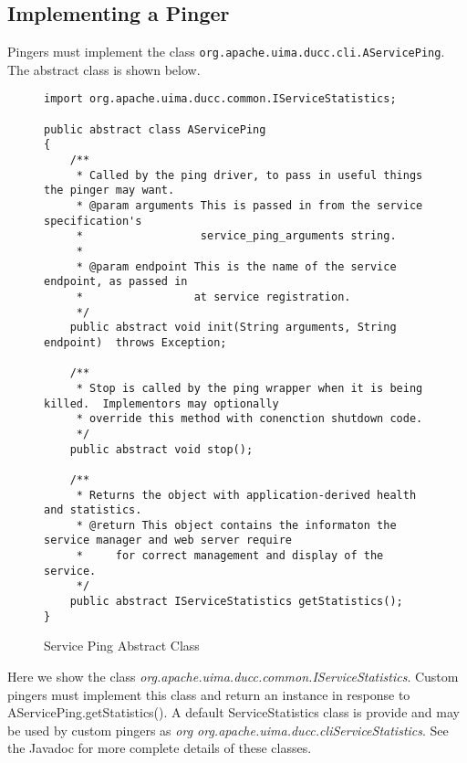       \subsection{Implementing a Pinger}
      Pingers must implement the class {\tt org.apache.uima.ducc.cli.AServicePing}.  The abstract class
      is shown below.
      \begin{figure}[H]
\begin{verbatim}
import org.apache.uima.ducc.common.IServiceStatistics;

public abstract class AServicePing
{
    /**
     * Called by the ping driver, to pass in useful things the pinger may want.
     * @param arguments This is passed in from the service specification's
     *                  service_ping_arguments string.
     *
     * @param endpoint This is the name of the service endpoint, as passed in
     *                 at service registration.
     */
    public abstract void init(String arguments, String endpoint)  throws Exception;

    /**
     * Stop is called by the ping wrapper when it is being killed.  Implementors may optionally
     * override this method with conenction shutdown code.
     */
    public abstract void stop();

    /**
     * Returns the object with application-derived health and statistics.
     * @return This object contains the informaton the service manager and web server require
     *     for correct management and display of the service.
     */
    public abstract IServiceStatistics getStatistics();    
}

\end{verbatim}
        \caption{Service Ping Abstract Class}
        \label{fig:service.abstract.pinger}

      \end{figure}
 
      Here we show the class {\em org.apache.uima.ducc.common.IServiceStatistics}.  Custom pingers must
      implement this class and return an instance in response to AServicePing.getStatistics().  A default
      ServiceStatistics class is provide and may be used by custom pingers as
      {\em org org.apache.uima.ducc.cliServiceStatistics}.  See the Javadoc for more complete details
      of these classes.

